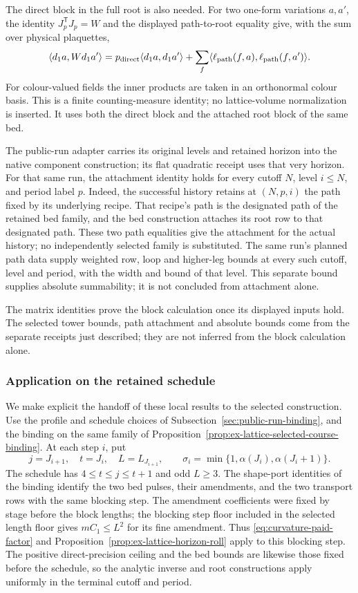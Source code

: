 The direct block in the full root is also needed. For two one-form
variations $a,a'$, the identity $J_p^{\mathsf T}J_p=W$ and the displayed
path-to-root equality give, with the sum over physical plaquettes,
\[
 \langle d_1a,Wd_1a'\rangle
 =p_{\rm direct}\langle d_1a,d_1a'\rangle
  +\sum_{f}\langle\ell_{\rm path}(f,a),
                   \ell_{\rm path}(f,a')\rangle.
\]
For colour-valued fields the inner products are taken in an orthonormal
colour basis. This is a finite counting-measure identity; no lattice-volume
normalization is inserted. It uses both the direct block and the attached
root block of the same bed.

The public-run adapter carries its original levels and retained horizon
into the native component construction; its flat quadratic receipt uses
that very horizon. For that same run, the attachment identity holds for
every cutoff $N$, level $i\leq N$, and period label $p$. Indeed, the
successful history retains at $(N,p,i)$ the path fixed by its underlying
recipe. That recipe's path is the designated path of the retained bed
family, and the bed construction attaches its root row to that designated
path. These two path equalities give the attachment for the actual history;
no independently selected family is substituted. The same run's planned path data supply weighted row, loop and higher-leg bounds at every such
cutoff, level and period, with the width and bound of that level. This
separate bound supplies absolute summability; it is not concluded from
attachment alone.

The matrix identities prove the block calculation once its displayed
inputs hold. The selected tower bounds, path attachment and absolute bounds
come from the separate receipts just described; they are not inferred from
the block calculation alone.

\subsubsection{Application on the retained schedule}
\label{subsec:ex-lattice-c01-selected-application}
We make explicit the handoff of these local results to the selected
construction. Use the profile and schedule choices of
Subsection~\ref{sec:public-run-binding}, and the binding on the same family
of Proposition~\ref{prop:ex-lattice-selected-course-binding}.
At each step $i$, put
\[
 j=J_{i+1},\quad t=J_i,\quad L=L_{J_{i+1}},\qquad
 \sigma_i=\min\{1,\alpha(J_i),\alpha(J_i+1)\}.
\]
The schedule has $4\le t\le j\le t+1$ and odd $L\ge3$.
The shape-port identities of the binding identify the two bed pulses,
their amendments, and the two transport rows with the same blocking step.
The amendment coefficients were fixed by stage before the block lengths;
the blocking step floor included in the selected length floor gives
$mC_1\le L^2$ for its fine amendment. Thus
\eqref{eq:curvature-paid-factor} and
Proposition~\ref{prop:ex-lattice-horizon-roll} apply to this blocking step.
The positive direct-precision ceiling and the bed bounds are likewise
those fixed before the schedule, so the analytic inverse and root
constructions apply uniformly in the terminal cutoff and period.

